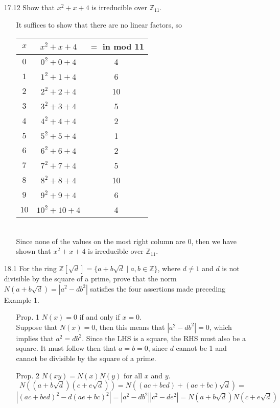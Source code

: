 \documentclass[12pt]{article}
\begin{document}
\begin{enumerate}
\item[17.12] Show that $x^2 + x + 4$ is irreducible over $\mathbb{Z}_{11}$.
\begin{enumerate}
\item[] It suffices to show that there are no linear factors, so \\
\begin{tabular}{|c|c|c|}
\hline
$x$ & $x^2 + x + 4$ & $=$ in mod 11\\
\hline 
$0$ & $0^2 + 0 + 4$ & 4\\
\hline 
$1$ & $1^2 + 1 + 4$ & 6\\
\hline
$2$ & $2^2 + 2 + 4$ & 10\\
\hline
$3$ & $3^2 + 3 + 4$ & 5\\
\hline 
$4$ & $4^2 + 4 + 4$ & 2\\
\hline
$5$ & $5^2 + 5 + 4$ & 1\\
\hline
$6$ & $6^2 + 6 + 4$ & 2\\
\hline 
$7$ & $7^2 + 7 + 4$ & 5\\
\hline
$8$ & $8^2 + 8 + 4$ & 10\\
\hline
$9$ & $9^2 + 9 + 4$ & 6\\
\hline 
$10$ & $10^2 + 10 + 4$ & 4\\
\hline
\end{tabular} \\
Since none of the values on the most right column are 0, then we have shown that $x^2 + x + 4$ is 
irreducible over $\mathbb{Z}_{11}$.
\end{enumerate}

\item[18.1] For the ring $\mathbb{Z}[\sqrt{d}] = \{ a + b\sqrt{d} \mid a, b \in \mathbb{Z} \}$,
where $d \neq 1$ and $d$ is not divisible by the square of a prime, prove that the norm
$N(a + b\sqrt{d}) = |a^2 - db^2 |$ satisfies the four assertions made preceding Example 1.
\begin{enumerate}
\item[]
\item[Prop. 1] $N(x) = 0$ if and only if $x = 0$. \\
Suppose that $N(x) = 0$, then this means that $|a^2 - db^2| = 0$, which implies that 
$a^2 = db^2$. Since the LHS is a square, the RHS must also be a square. It must follow then
that $a = b = 0$, since $d$ cannot be 1 and cannot be divisible by the square of a prime.

\item[Prop. 2] $N(xy) = N(x)N(y)$ for all $x$ and $y$.
\[ 
N((a + b\sqrt{d})(c + e\sqrt{d})) = N((ac + bed) + (ae + bc)\sqrt{d}) =
\]
\[ 
|(ac + bed)^2 - d(ae + bc)^2| = |a^2 - db^2||c^2 - de^2| = N(a + b\sqrt{d})N(c + e\sqrt{d})
\]


\end{enumerate}
\end{enumerate}
\end{document}
